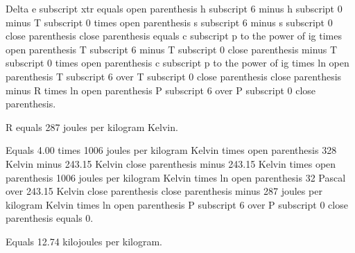 Delta e subscript xtr equals open parenthesis h subscript 6 minus h subscript 0 minus T subscript 0 times open parenthesis s subscript 6 minus s subscript 0 close parenthesis close parenthesis equals c subscript p to the power of ig times open parenthesis T subscript 6 minus T subscript 0 close parenthesis minus T subscript 0 times open parenthesis c subscript p to the power of ig times ln open parenthesis T subscript 6 over T subscript 0 close parenthesis close parenthesis minus R times ln open parenthesis P subscript 6 over P subscript 0 close parenthesis.

R equals 287 joules per kilogram Kelvin.

Equals 4.00 times 1006 joules per kilogram Kelvin times open parenthesis 328 Kelvin minus 243.15 Kelvin close parenthesis minus 243.15 Kelvin times open parenthesis 1006 joules per kilogram Kelvin times ln open parenthesis 32 Pascal over 243.15 Kelvin close parenthesis close parenthesis minus 287 joules per kilogram Kelvin times ln open parenthesis P subscript 6 over P subscript 0 close parenthesis equals 0.

Equals 12.74 kilojoules per kilogram.